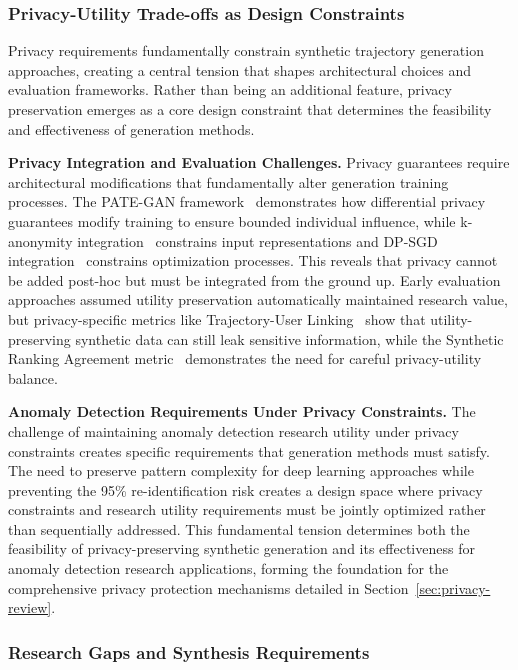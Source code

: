 \documentclass[runningheads]{llncs}
\begin{document}
\subsubsection{Privacy-Utility Trade-offs as Design Constraints}

Privacy requirements fundamentally constrain synthetic trajectory generation approaches, creating a central tension that shapes architectural choices and evaluation frameworks. Rather than being an additional feature, privacy preservation emerges as a core design constraint that determines the feasibility and effectiveness of generation methods.

\textbf{Privacy Integration and Evaluation Challenges.} Privacy guarantees require architectural modifications that fundamentally alter generation training processes. The PATE-GAN framework~\cite{jordon2019pate} demonstrates how differential privacy guarantees modify training to ensure bounded individual influence, while k-anonymity integration~\cite{rao2023cats} constrains input representations and DP-SGD integration~\cite{merhi2024synthetic} constrains optimization processes. This reveals that privacy cannot be added post-hoc but must be integrated from the ground up. Early evaluation approaches assumed utility preservation automatically maintained research value, but privacy-specific metrics like Trajectory-User Linking~\cite{rao2023cats} show that utility-preserving synthetic data can still leak sensitive information, while the Synthetic Ranking Agreement metric~\cite{jordon2019pate} demonstrates the need for careful privacy-utility balance.

\textbf{Anomaly Detection Requirements Under Privacy Constraints.} The challenge of maintaining anomaly detection research utility under privacy constraints creates specific requirements that generation methods must satisfy. The need to preserve pattern complexity for deep learning approaches while preventing the 95\% re-identification risk creates a design space where privacy constraints and research utility requirements must be jointly optimized rather than sequentially addressed. This fundamental tension determines both the feasibility of privacy-preserving synthetic generation and its effectiveness for anomaly detection research applications, forming the foundation for the comprehensive privacy protection mechanisms detailed in Section~\ref{sec:privacy-review}.

\subsubsection{Research Gaps and Synthesis Requirements}
\end{document}
